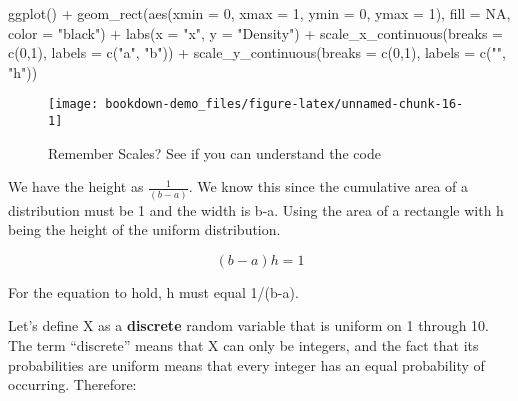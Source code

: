 \documentclass[
]{book}
\newenvironment{Shaded}{\begin{snugshade}}{\end{snugshade}}
\newcommand{\AttributeTok}[1]{\textcolor[rgb]{0.77,0.63,0.00}{#1}}
\newcommand{\ConstantTok}[1]{\textcolor[rgb]{0.00,0.00,0.00}{#1}}
\newcommand{\DecValTok}[1]{\textcolor[rgb]{0.00,0.00,0.81}{#1}}
\newcommand{\FunctionTok}[1]{\textcolor[rgb]{0.00,0.00,0.00}{#1}}
\newcommand{\NormalTok}[1]{#1}
\newcommand{\SpecialCharTok}[1]{\textcolor[rgb]{0.00,0.00,0.00}{#1}}
\newcommand{\StringTok}[1]{\textcolor[rgb]{0.31,0.60,0.02}{#1}}
\begin{document}
\begin{Shaded}
\begin{Highlighting}[]
\FunctionTok{ggplot}\NormalTok{() }\SpecialCharTok{+}
  \FunctionTok{geom\_rect}\NormalTok{(}\FunctionTok{aes}\NormalTok{(}\AttributeTok{xmin =} \DecValTok{0}\NormalTok{, }\AttributeTok{xmax =} \DecValTok{1}\NormalTok{, }\AttributeTok{ymin =} \DecValTok{0}\NormalTok{, }\AttributeTok{ymax =} \DecValTok{1}\NormalTok{), }
            \AttributeTok{fill =} \ConstantTok{NA}\NormalTok{,}
            \AttributeTok{color =} \StringTok{"black"}\NormalTok{) }\SpecialCharTok{+}
  \FunctionTok{labs}\NormalTok{(}\AttributeTok{x =} \StringTok{"x"}\NormalTok{, }\AttributeTok{y =} \StringTok{"Density"}\NormalTok{) }\SpecialCharTok{+}
  \FunctionTok{scale\_x\_continuous}\NormalTok{(}\AttributeTok{breaks =} \FunctionTok{c}\NormalTok{(}\DecValTok{0}\NormalTok{,}\DecValTok{1}\NormalTok{), }\AttributeTok{labels =} \FunctionTok{c}\NormalTok{(}\StringTok{"a"}\NormalTok{, }\StringTok{"b"}\NormalTok{)) }\SpecialCharTok{+}
  \FunctionTok{scale\_y\_continuous}\NormalTok{(}\AttributeTok{breaks =} \FunctionTok{c}\NormalTok{(}\DecValTok{0}\NormalTok{,}\DecValTok{1}\NormalTok{), }\AttributeTok{labels =} \FunctionTok{c}\NormalTok{(}\StringTok{""}\NormalTok{, }\StringTok{"h"}\NormalTok{))}
\end{Highlighting}
\end{Shaded}

\begin{figure}

{\centering \texttt{[image: bookdown-demo\_files/figure-latex/unnamed-chunk-16-1]} 

}

\caption{Remember Scales? See if you can understand the code}\label{fig:unnamed-chunk-16}
\end{figure}

We have the height as \(\frac{1}{(b-a)}\). We know this since the cumulative area of a distribution must be 1 and the width is b-a. Using the area of a rectangle with h being the height of the uniform distribution.

\[(b-a)h=1\]

For the equation to hold, h must equal 1/(b-a).

Let's define X as a \textbf{discrete} random variable that is uniform on 1 through 10. The term ``discrete'' means that X can only be integers, and the fact that its probabilities are uniform means that every integer has an equal probability of occurring. Therefore:
\end{document}
